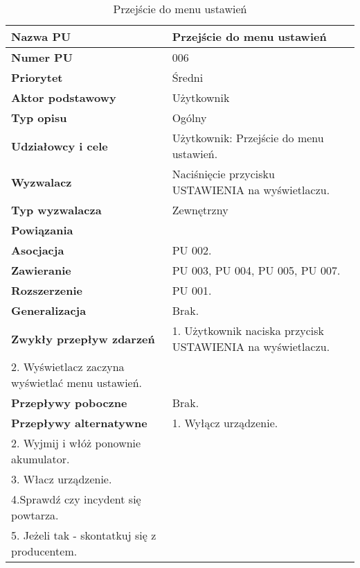\documentclass{article}
\begin{document}
\begin{table}[htbp]
    \centering
    \caption{Przejście do menu ustawień}
    \label{tab:menu-główne}
    \begin{tabular}{|l|l|}
    \hline
    \textbf{Nazwa PU} & Przejście do menu ustawień\\ \hline
    \textbf{Numer PU} & 006 \\ \hline
    \textbf{Priorytet} & Średni \\ \hline
    \textbf{Aktor podstawowy} & Użytkownik \\ \hline
    \textbf{Typ opisu} & Ogólny \\ \hline
    \textbf{Udziałowcy i cele} & Użytkownik: Przejście do menu ustawień. \\ \hline
    \textbf{Wyzwalacz} & Naciśnięcie przycisku USTAWIENIA na wyświetlaczu. \\ \hline
    \textbf{Typ wyzwalacza} & Zewnętrzny \\ \hline
    \textbf{Powiązania}& \\ \hline
    \textbf{Asocjacja} & PU 002. \\ \hline	
    \textbf{Zawieranie} & PU 003, PU 004, PU 005, PU 007.\\ \hline
    \textbf{Rozszerzenie} & PU 001.\\ \hline
    \textbf{Generalizacja} & Brak.\\ \hline
    \textbf{Zwykły przepływ zdarzeń} & 1. Użytkownik naciska przycisk USTAWIENIA na wyświetlaczu. \\2. Wyświetlacz zaczyna wyświetlać menu ustawień. \\ \hline
    \textbf{Przepływy poboczne} & Brak. \\ \hline
    \textbf{Przepływy alternatywne} & 1. Wyłącz urządzenie. \\ 2. Wyjmij i włóż ponownie akumulator. \\ 3. Włacz urządzenie.\\ 4.Sprawdź czy incydent się powtarza. \\ 5. Jeżeli tak - skontatkuj się z producentem. \\ \hline
    \end{tabular}
\end{table}
\end{document}
